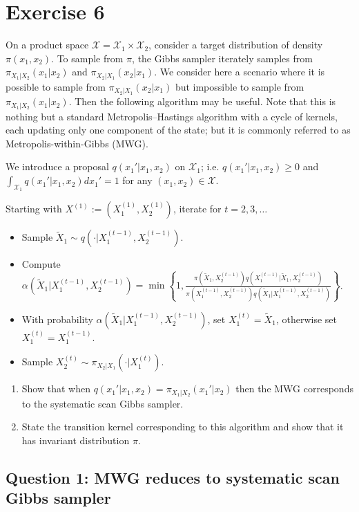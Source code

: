\section*{Exercise 6}
On a product space $\mathcal{X} = \mathcal{X}_1 \times \mathcal{X}_2$, consider a target distribution of density $\pi (x_1, x_2)$. To sample from $\pi$, the Gibbs sampler iterately samples from $\pi_{X_1|X_2}(x_1| x_2)$ and $\pi_{X_2|X_1}(x_2| x_1)$. We consider here a scenario where it is possible to sample from $\pi_{X_2|X_1}(x_2| x_1)$ but impossible to sample from $\pi_{X_1|X_2}(x_1| x_2)$. Then the following algorithm may be useful. Note that this is nothing but a standard Metropolis--Hastings algorithm with a cycle of kernels, each updating only one component of the state; but it is commonly referred to as Metropolis-within-Gibbs (MWG).

We introduce a proposal $q (x_1'| x_1, x_2)$ on $\mathcal{X}_1$; i.e. $q (x_1'| x_1, x_2) \geq 0$ and $\int_{\mathcal{X}_1} q (x_1'| x_1, x_2) dx_1' = 1$ for any $(x_1, x_2) \in \mathcal{X}$.

Starting with $X^{(1)} := \left(X_1^{(1)}, X_2^{(1)}\right)$, iterate for $t = 2, 3, \ldots$
\begin{itemize}
\item Sample $\tilde{X}_1 \sim q\left(\cdot| X_1^{(t-1)}, X_2^{(t-1)}\right)$.
\item Compute $\alpha\left(\tilde{X}_1| X_1^{(t-1)}, X_2^{(t-1)}\right) = \min\left\{1,\frac{\pi\left(\tilde{X}_1,X_2^{(t-1)}\right)q\left(X_1^{(t-1)}|\tilde{X}_1,X_2^{(t-1)}\right)}{\pi\left(X_1^{(t-1)},X_2^{(t-1)}\right)q\left(\tilde{X}_1|X_1^{(t-1)},X_2^{(t-1)}\right)}\right\}$.
\item With probability $\alpha\left(\tilde{X}_1| X_1^{(t-1)}, X_2^{(t-1)}\right)$, set $X_1^{(t)} = \tilde{X}_1$, otherwise set $X_1^{(t)} = X_1^{(t-1)}$.
\item Sample $X_2^{(t)} \sim \pi_{X_2|X_1}\left(\cdot| X_1^{(t)}\right)$.
\end{itemize}

\begin{enumerate}
\item Show that when $q (x_1'| x_1, x_2) = \pi_{X_1|X_2}(x_1'| x_2)$ then the MWG corresponds to the systematic scan Gibbs sampler.
\item State the transition kernel corresponding to this algorithm and show that it has invariant distribution $\pi$.
\end{enumerate}

\subsection*{Question 1: MWG reduces to systematic scan Gibbs sampler}

